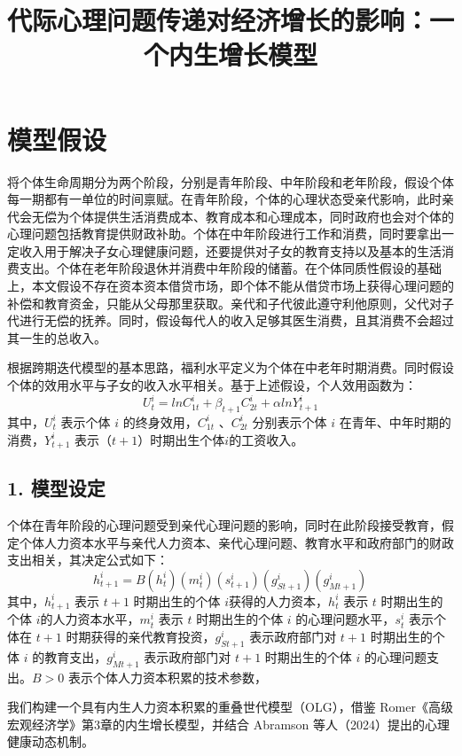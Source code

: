 \documentclass[12pt]{article}
\title{代际心理问题传递对经济增长的影响：一个内生增长模型}
\author{}
\date{}
\begin{document}
\maketitle

\section*{模型假设}

将个体生命周期分为两个阶段，分别是青年阶段、中年阶段和老年阶段，假设个体每一期都有一单位的时间禀赋。在青年阶段，个体的心理状态受亲代影响，此时亲代会无偿为个体提供生活消费成本、教育成本和心理成本，同时政府也会对个体的心理问题包括教育提供财政补助。个体在中年阶段进行工作和消费，同时要拿出一定收入用于解决子女心理健康问题，还要提供对子女的教育支持以及基本的生活消费支出。个体在老年阶段退休并消费中年阶段的储蓄。在个体同质性假设的基础上，本文假设不存在资本资本借贷市场，即个体不能从借贷市场上获得心理问题的补偿和教育资金，只能从父母那里获取。亲代和子代彼此遵守利他原则，父代对子代进行无偿的抚养。同时，假设每代人的收入足够其医生消费，且其消费不会超过其一生的总收入。

根据跨期迭代模型的基本思路，福利水平定义为个体在中老年时期消费。同时假设个体的效用水平与子女的收入水平相关。基于上述假设，个人效用函数为：
\[
U^i_t = lnC^i_{1t} + \beta_{t+1}C^i_{2t}+ \alpha lnY^i_{t+1}
\]
其中，$U^i_t$ 表示个体 $i$ 的终身效用，$C^i_{1t}$ 、$C^i_{2t}$ 分别表示个体 $i$ 在青年、中年时期的消费，$Y^i_{t+1}$ 表示（$t+1$）时期出生个体$i$的工资收入。

\subsection*{1. 模型设定}
个体在青年阶段的心理问题受到亲代心理问题的影响，同时在此阶段接受教育，假定个体人力资本水平与亲代人力资本、亲代心理问题、教育水平和政府部门的财政支出相关，其决定公式如下：
\[
h^i_{t+1}=B(h^i_t)(m^i_t)(s^i_{t+1})(g^i_{St+1})(g^i_{Mt+1})^{}
\]
其中，$h^i_{t+1}$ 表示 $t+1$ 时期出生的个体 $i$获得的人力资本，$h^i_t$ 表示 $t$ 时期出生的个体 $i$的人力资本水平，$m^i_t$ 表示 $t$ 时期出生的个体 $i$ 的心理问题水平，$s^i_t$ 表示个体在 $t+1$ 时期获得的亲代教育投资，$g^i_{St+1}$ 表示政府部门对 $t+1$ 时期出生的个体 $i$ 的教育支出，$g^i_{Mt+1}$ 表示政府部门对 $t+1$ 时期出生的个体 $i$ 的心理问题支出。$B>0$ 表示个体人力资本积累的技术参数，







我们构建一个具有内生人力资本积累的重叠世代模型（OLG），借鉴 Romer《高级宏观经济学》第3章的内生增长模型，并结合 Abramson 等人（2024）提出的心理健康动态机制。
\end{document}
